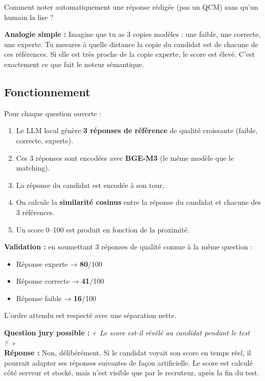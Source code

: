 \documentclass[12pt,a4paper]{article}
\newenvironment{simplification}{%
  \def\FrameCommand{\fboxsep=8pt\colorbox{green!10}}%
  \MakeFramed{\advance\hsize-\width \FrameRestore}%
  \vspace{-4pt}%
}{\endMakeFramed}
\newenvironment{jury}{%
  \def\FrameCommand{\fboxsep=8pt\colorbox{orange!12}}%
  \MakeFramed{\advance\hsize-\width \FrameRestore}%
  \vspace{-4pt}%
}{\endMakeFramed}
\begin{document}
Comment noter automatiquement une réponse rédigée (pas un QCM) sans qu'un humain la lise ?

\begin{simplification}
\textbf{Analogie simple :}
Imagine que tu as 3 copies modèles : une faible, une correcte, une experte. Tu mesures à quelle distance la copie du candidat est de chacune de ces références. Si elle est très proche de la copie experte, le score est élevé. C'est exactement ce que fait le noteur sémantique.
\end{simplification}

\subsection{Fonctionnement}

Pour chaque question ouverte :
\begin{enumerate}
  \item Le LLM local génère \textbf{3 réponses de référence} de qualité croissante (faible, correcte, experte).
  \item Ces 3 réponses sont encodées avec \textbf{BGE-M3} (le même modèle que le matching).
  \item La réponse du candidat est encodée à son tour.
  \item On calcule la \textbf{similarité cosinus} entre la réponse du candidat et chacune des 3 références.
  \item Un score 0--100 est produit en fonction de la proximité.
\end{enumerate}

\textbf{Validation :} en soumettant 3 réponses de qualité connue à la même question :
\begin{itemize}
  \item Réponse experte → \textbf{80}/100
  \item Réponse correcte → \textbf{41}/100
  \item Réponse faible → \textbf{16}/100
\end{itemize}
L'ordre attendu est respecté avec une séparation nette.

\begin{jury}
\textbf{Question jury possible :} \textit{«~Le score est-il révélé au candidat pendant le test ?~»}\\[4pt]
\textbf{Réponse :} Non, délibérément. Si le candidat voyait son score en temps réel, il pourrait adapter ses réponses suivantes de façon artificielle. Le score est calculé côté serveur et stocké, mais n'est visible que par le recruteur, après la fin du test.
\end{jury}
\end{document}
